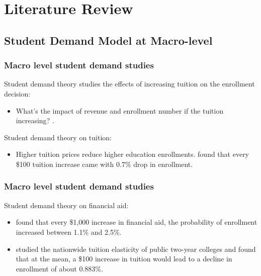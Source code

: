 \documentclass{beamer}
\begin{document}
\section{Literature Review}

\subsection{Student Demand Model at Macro-level}

\begin{frame}
    \frametitle{Macro level student demand studies}
Student demand theory studies the effects of increasing tuition on the
enrollment decision:
\begin{itemize}
\item What's the impact of revenue and enrollment number if the tuition
increasing?
\citep{Leslie1987,  Leslie1988, Heller1997, Ehrenberg2004, Crouse2015}.
\end{itemize}

Student demand theory on tuition:
\begin{itemize}
\item Higher tuition prices reduce higher education enrollments.
\citet{Leslie1987} found that every \$100 tuition increase came with 0.7\%
drop in enrollment.
\end{itemize}
\end{frame}


\begin{frame}
    \frametitle{Macro level student demand studies}
 Student demand theory on financial aid:
\begin{itemize}
\item  \citet{Braunstein1999} found that every \$1,000 increase in
financial aid, the probability of enrollment increased between 1.1\% and
2.5\%.
 \item \citet{Crouse2015} studied the nationwide tuition elasticity of 
public two-year colleges and found that at the mean, a \$100 increase in
tuition would lead to a decline in enrollment of about 0.883\%.
 \end{itemize}
\end{frame}
\end{document}
